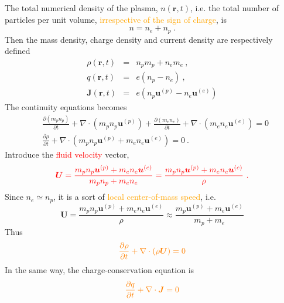 \documentclass[12pt,a4paper]{article}
\renewcommand{\vec}[1]{\boldsymbol{#1}}
\begin{document}
The total numerical density of the plasma, $n(\vec{r}, t)$, i.e. the total number of particles per unit volume, \textcolor{orange}{irrespective of the sign of charge}, is
\begin{equation*}
n = n_e + n_p ~.
\end{equation*}
Then the mass density, charge density and current density are respectively defined
\begin{eqnarray*}
\rho(\vec{r}, t) &=& n_p m_p +n_e m_e ~, \\
q(\vec{r}, t) &=& e(n_p -n_e) ~, \\
\vec{J} (\vec{r}, t) &=& e(n_p \vec{u}^{(p)} -n_e \vec{u}^{(e)})
\end{eqnarray*}
The continuity equations becomes
\begin{align*}
& \boxed{\frac{\partial (m_p n_p)}{\partial t} + \nabla \cdot (m_p n_p\vec{u}^{(p)}) + \frac{\partial (m_e n_e)}{\partial t} + \nabla \cdot (m_e n_e \vec{u}^{(e)}) = 0}\\
& \frac{\partial \rho}{\partial t} + \nabla \cdot (m_p n_p\vec{u}^{(p)} + m_e n_e \vec{u}^{(e)}) = 0~.
\end{align*}
Introduce the \textcolor{red}{fluid velocity} vector,
\begin{equation}
\color{red} \vec{U} = \frac{m_p n_p\vec{u}^{(p)} + m_e n_e \vec{u}^{(e)}}{m_p n_p + m_e n_e} = \frac{m_p n_p\vec{u}^{(p)} + m_e n_e \vec{u}^{(e)}}{\rho} ~.
\end{equation}
Since $n_e \simeq n_p$, it is a sort of \textcolor{orange}{local center-of-mass speed}, i.e.
\begin{equation*}
\vec{U} = \frac{m_p n_p\vec{u}^{(p)} + m_e n_e \vec{u}^{(e)}}{\rho} \approx \frac{m_p \vec{u}^{(p)} + m_e \vec{u}^{(e)}}{m_p +m_e}
\end{equation*}
Thus
\begin{equation}
\color{orange} \frac{\partial \rho}{\partial t} + \nabla \cdot (\rho \vec{U}) = 0
\label{one_conti}
\end{equation}
In the same way,  the charge-conservation equation is
\begin{equation}
\color{orange} \frac{\partial q}{\partial t} + \nabla \cdot \vec{J} = 0
\label{one_charge_conser}
\end{equation}
\end{document}
